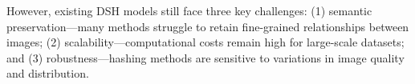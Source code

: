 However, existing DSH models still face three key challenges: (1) semantic preservation—many methods struggle to retain fine-grained relationships between images; (2) scalability—computational costs remain high for large-scale datasets; and (3) robustness—hashing methods are sensitive to variations in image quality and distribution.


        

         


